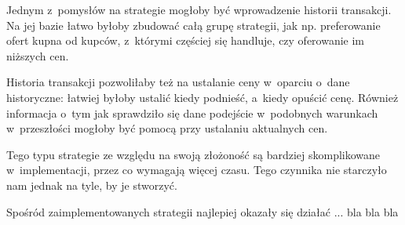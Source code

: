\documentclass[12pt]{article}
\begin{document}
Jednym z~pomysłów na strategie mogłoby być wprowadzenie historii transakcji. Na jej bazie łatwo byłoby zbudować całą grupę strategii, jak np. preferowanie ofert kupna od kupców, z~którymi częściej się handluje, czy
oferowanie im niższych cen.

Historia transakcji pozwoliłaby też na ustalanie ceny w~oparciu o~dane historyczne: łatwiej byłoby ustalić kiedy podnieść, a~kiedy opuścić cenę. Również informacja o~tym jak sprawdziło się dane podejście w~podobnych
warunkach w~przeszłości mogłoby być pomocą przy ustalaniu aktualnych cen.

Tego typu strategie ze względu na swoją złożoność są bardziej skomplikowane w~implementacji, przez co wymagają więcej czasu. Tego czynnika nie starczyło nam jednak na tyle, by je stworzyć.

Spośród zaimplementowanych strategii najlepiej okazały się działać ... bla bla bla
\end{document}
